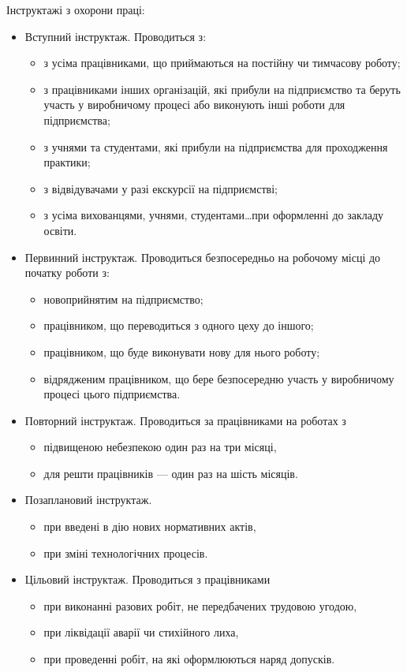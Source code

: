 \documentclass[a4paper,10pt,notitlepage,pdftex,headsepline]{scrartcl}
\begin{document}
  Інструктажі з охорони праці:
  \begin{itemize}
    \item Вступний інструктаж.
      Проводиться з:
      \begin{itemize}
        \item з усіма працівниками, що приймаються на постійну чи тимчасову
          роботу;
        \item з працівниками інших організацій, які прибули на підприємство та
          беруть участь у виробничому процесі або виконують інші роботи для
          підприємства;
        \item з учнями та студентами, які прибули на підприємства для
          проходження практики;
        \item з відвідувачами у разі екскурсії на підприємстві;
        \item з усіма вихованцями, учнями, студентами\ldots при оформленні до
          закладу освіти.
      \end{itemize}
    \item Первинний інструктаж.
      Проводиться безпосередньо на робочому місці до початку роботи з:
      \begin{itemize}
        \item новоприйнятим на підприємство;
        \item працівником, що переводиться з одного цеху до іншого;
        \item працівником, що буде виконувати нову для нього роботу;
        \item відрядженим працівником, що бере безпосередню участь у
          виробничому процесі цього підприємства.
      \end{itemize}
    \item Повторний інструктаж.
      Проводиться за працівниками на роботах з
      \begin{itemize}
        \item підвищеною небезпекою один раз на три місяці,
        \item для решти працівників --- один раз на шість місяців.
      \end{itemize}
    \item Позаплановий інструктаж.
      \begin{itemize}
        \item при введені в дію нових нормативних актів,
        \item при зміні технологічних процесів.
      \end{itemize}
    \item Цільовий інструктаж.
      Проводиться з працівниками
      \begin{itemize}
        \item при виконанні разових робіт, не передбачених трудовою угодою,
        \item при ліквідації аварії чи стихійного лиха,
        \item при проведенні робіт, на які оформлюються наряд допусків.
      \end{itemize}
  \end{itemize}
\end{document}
